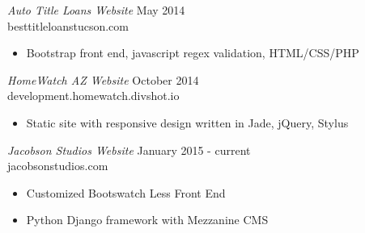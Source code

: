 \documentclass[margin]{res}
\begin{document}
\begin{resume}
  {\sl Auto Title Loans Website} \hfill May 2014 \\
  besttitleloanstucson.com
  \begin{itemize}
      \item Bootstrap front end, javascript regex validation, HTML/CSS/PHP
  \end{itemize} 

  {\sl HomeWatch AZ Website} \hfill October 2014 \\
  development.homewatch.divshot.io
  \begin{itemize}
      \item Static site with responsive design written in Jade, jQuery, Stylus
  \end{itemize} 

  {\sl Jacobson Studios Website} \hfill January 2015 - current \\
  jacobsonstudios.com
  \begin{itemize}
      \item Customized Bootswatch Less Front End
      \item Python Django framework with Mezzanine CMS
  \end{itemize} 



\end{resume}
\end{document}

